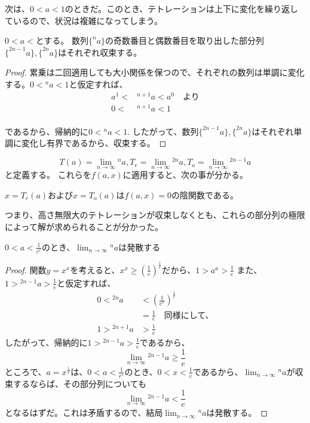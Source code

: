 	次は、$0 < a < 1$のときだ。このとき、テトレーションは上下に変化を繰り返しているので、状況は複雑になってしまう。
	\begin{lemma}
		$0 < a < $とする。
		数列$\{^n a\}$の奇数番目と偶数番目を取り出した部分列$\{^{2n-1} a\},\{^{2n} a\}$はそれぞれ収束する。
	\end{lemma}
	\begin{proof}
	
		累乗は二回適用しても大小関係を保つので、それぞれの数列は単調に変化する。$0 < {^n a} < 1$と仮定すれば、
		\begin{align*}
			a^1<&{^{n+1} a}<a^0 \quad \text{より}\\
			0<&{^{n+1} a}<1 \\
		\end{align*}
		
		であるから、帰納的に$0 < {^n a} < 1$.
		したがって、数列$\{^{2n-1} a\},\{^{2n} a\}$はそれぞれ単調に変化し有界であるから、収束する。
	\end{proof}

	\[
		T(a) = \lim_{n \to \infty} {^n a},
		T_e = \lim_{n \to \infty} {^{2n} a},
		T_o = \lim_{n \to \infty} {^{2n - 1} a}
	\]と定義する。
	これらを$f(a,x)$に適用すると、次の事が分かる。
	\begin{theorem}
	\label{th:tetration_implicit_function}
		$x = T_e(a)$および$x = T_o(a)$は$f(a,x)=0$の陰関数である。
	\end{theorem}
	つまり、高さ無限大のテトレーションが収束しなくとも、これらの部分列の極限によって解が求められることが分かった。
	
	\begin{theorem}
		$0 < a < \frac{1}{e^e}$のとき、$\displaystyle \lim_{n \to \infty} {^n a}$は発散する
	\end{theorem}
	\begin{proof}
		
		関数$y = x^x$を考えると、$x^x \geq (\frac{1}{e})^{\frac{1}{e}}$だから、$1 > a^a > \frac{1}{e}$
		また、$1 > {^{2n-1} a} > \frac{1}{e}$と仮定すれば、
		\begin{align*}
			0 < {^{2n} a} &< (\frac{1}{e^e})^{\frac{1}{e}} \\
						  &= \frac{1}{e} \quad \text{同様にして、} \\
			1 > {^{2n+1} a} &> \frac{1}{e}
		\end{align*}
		したがって、帰納的に$1 > {^{2n-1} a} > \frac{1}{e}$であるから、
		\begin{equation*}
			\lim_{n \to \infty} {^{2n - 1} a} \geq \frac{1}{e}
		\end{equation*}
		ところで、$a = x^{\frac{1}{x}}$は、$0 < a < \frac{1}{e^e}$のとき、$0 < x < \frac{1}{e}$であるから、$\displaystyle \lim_{n \to \infty} {^n a}$が収束するならば、その部分列についても
		\begin{equation*}
			\lim_{n \to \infty} {^{2n - 1} a} < \frac{1}{e}
		\end{equation*}
		となるはずだ。これは矛盾するので、結局$\lim_{n \to \infty} {^n a}$は発散する。
	\end{proof}
	
